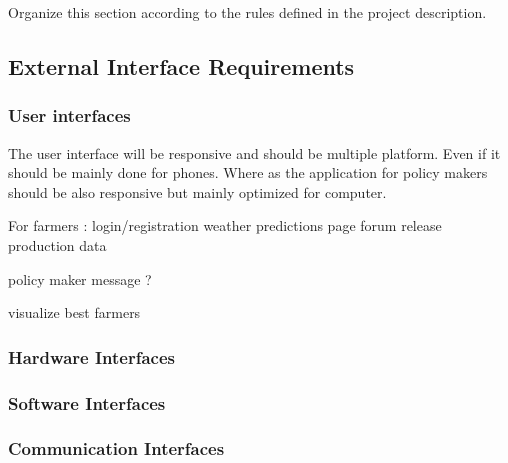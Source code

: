 Organize this section according to the rules defined in the project description. 

\subsection{External Interface Requirements}
\subsubsection{User interfaces}
The user interface will be responsive and should be multiple platform. Even if it should be mainly done for phones. \newline
Where as the application for policy makers should be also responsive but mainly optimized for computer.

For farmers :
login/registration
weather predictions page
forum
release production data

policy maker
message ?

visualize best farmers

\subsubsection{Hardware Interfaces}
\subsubsection{Software Interfaces}
\subsubsection{Communication Interfaces}
